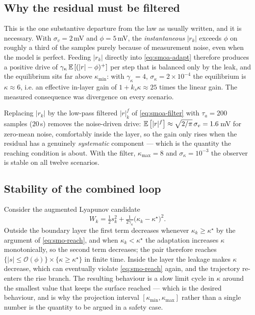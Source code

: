 \subsection{Why the residual must be filtered}
\label{sec:smoa-filter}
This is the one substantive departure from the law as usually written, and it is necessary.  With
$\sigma_v = 2$\,mV and $\phi = 5$\,mV, the \emph{instantaneous} $|r_k|$ exceeds $\phi$ on roughly
a third of the samples purely because of measurement noise, even when the model is perfect.
Feeding $|r_k|$ directly into \eqref{eq:smoa-adapt} therefore produces a positive drive of
$\gamma_\kappa\,\mathbb{E}\left[(|r|-\phi)^+\right]$ per step that is balanced only by the leak, and the equilibrium
sits far above $\kappa_{\min}$: with $\gamma_\kappa=4$, $\sigma_\kappa=2\times10^{-4}$ the
equilibrium is $\kappa\approx6$, i.e. an effective in-layer gain of $1+k_s\kappa \approx 25$
times the linear gain.  The measured consequence was divergence on every scenario.

Replacing $|r_k|$ by the low-pass filtered $|r|^f_k$ of \eqref{eq:smoa-filter} with
$\tau_a = 200$ samples ($20$\,s) removes the noise-driven drive: $\mathbb{E}\left[|r|^f\right]\approx
\sqrt{2/\pi}\,\sigma_v = 1.6$\,mV for zero-mean noise, comfortably inside the layer, so the gain
only rises when the residual has a genuinely \emph{systematic} component --- which is the quantity
the reaching condition is about.  With the filter, $\kappa_{\max}=8$ and
$\sigma_\kappa = 10^{-3}$ the observer is stable on all twelve scenarios.

\subsection{Stability of the combined loop}
Consider the augmented Lyapunov candidate
\begin{equation}
W_k = \tfrac12 s_k^2 + \tfrac{1}{2\gamma_\kappa}\big(\kappa_k-\kappa^\star\big)^2 .
\label{eq:smoa-lyap}
\end{equation}
Outside the boundary layer the first term decreases whenever $\kappa_k\ge\kappa^\star$ by the
argument of \eqref{eq:smo-reach}, and when $\kappa_k<\kappa^\star$ the adaptation increases
$\kappa$ monotonically, so the second term decreases; the pair therefore reaches
$\{|s|\le\mathcal{O}(\phi)\}\times\{\kappa\ge\kappa^\star\}$ in finite time.  Inside the layer
the leakage makes $\kappa$ decrease, which can eventually violate \eqref{eq:smo-reach} again, and
the trajectory re-enters the rise branch.  The resulting behaviour is a slow limit cycle in
$\kappa$ around the smallest value that keeps the surface reached --- which is the desired
behaviour, and is why the projection interval $[\kappa_{\min},\kappa_{\max}]$ rather than a
single number is the quantity to be argued in a safety case.

